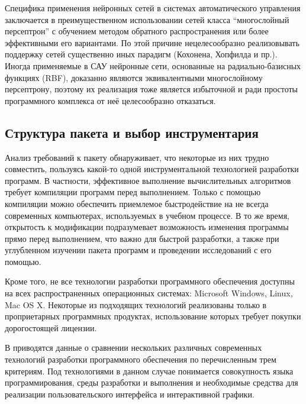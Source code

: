 Специфика применения нейронных сетей в системах автоматического
управления заключается в преимущественном использовании сетей класса
``многослойный персептрон'' с обучением методом обратного
распространения или более эффективными его вариантами.  По этой
причине нецелесообразно реализовывать поддержку сетей существенно иных
парадигм (Кохонена, Хопфилда и пр.).  Иногда применяемые в САУ
нейронные сети, основанные на радиально-базисных функциях (RBF),
доказанно являются эквивалентными многослойному персептрону, поэтому
их реализация тоже является избыточной и ради простоты программного
комплекса от неё целесообразно отказаться.

\subsection{Структура пакета и выбор инструментария}

Анализ требований к пакету обнаруживает, что некоторые из них трудно
совместить, пользуясь какой-то одной инструментальной технологией
разработки программ.  В частности, эффективное выполнение
вычислительных алгоритмов требует компиляции программ перед
выполнением.  Только с помощью компиляции можно обеспечить приемлемое
быстродействие на не всегда современных компьютерах, используемых в
учебном процессе.  В то же время, открытость к модификации
подразумевает возможность изменения программы прямо перед выполнением,
что важно для быстрой разработки, а также при углубленном изучении
пакета программ и проведении исследований с его помощью.

Кроме того, не все технологии разработки программного обеспечения
доступны на всех распространенных операционных системах: Microsoft
Windows, Linux, Mac OS X.  Некоторые из подходящих технологий
реализованы только в проприетарных программных продуктах,
использование которых требует покупки дорогостоящей лицензии.

В  приводятся данные о сравнении нескольких
различных современных технологий разработки программного обеспечения
по перечисленным трем критериям.  Под технологиями в данном случае
понимается совокупность языка программирования, среды разработки и
выполнения и необходимые средства для реализации пользовательского
интерфейса и интерактивной графики.

